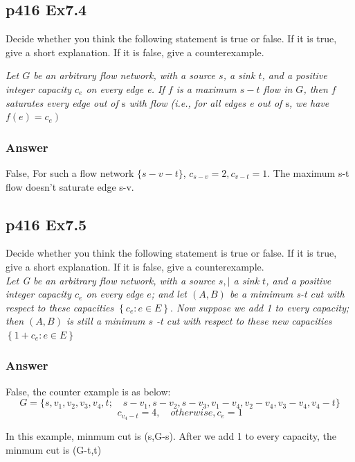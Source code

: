 \documentclass[a4paper]{article}
\begin{document}
\subsection*{p416 Ex7.4}
\begin{adjustwidth}{1cm}{1cm}
	Decide whether you think the following statement is true or false. If it is true, give a short explanation. If it is false, give a counterexample.

	\emph{
	Let $G$ be an arbitrary flow network, with a source $s$, a sink $t$, and a positive integer capacity $c_{e}$ on every edge e. If $f$ is a maximum $s-t$ flow in $G$, then $f$ saturates every edge out of $\mathrm{s}$ with flow (i.e., for all edges e out of $\mathrm{s}$, we have
	$\left.f(e)=c_{e}\right)$}
\end{adjustwidth}

\subsubsection*{Answer}
False, For such a flow network $\{s-v-t\}$, $c_{s-v} = 2, c_{v-t} = 1$. The maximum s-t flow doesn’t saturate edge s-v.
\vspace{2cm}

\subsection*{p416 Ex7.5}

\begin{adjustwidth}{1cm}{1cm}
	Decide whether you think the following statement is true or false. If it is true, give a short explanation. If it is false, give a counterexample.\\
	\emph{
	Let G be an arbitrary flow network, with a source $s, \mid$ a sink $t$, and a positive integer capacity $c_{e}$ on every edge $e$; and let $(A, B)$ be a mimimum s-t cut with respect to these capacities $\left\{c_{e}: e \in E\right\} .$ Now suppose we add 1 to every capacity; then $(A, B)$ is still a minimum $s$ -t cut with respect to these new capacities $\left\{1+c_{e}: e \in E\right\}$}
\end{adjustwidth}
\subsubsection*{Answer}
False, the counter example is as below:
$$G = \{s,v_1,v_2,v_3,v_4,t; \quad s-v_1,s-v_2,s-v_3,v_1-v_4,v_2-v_4,v_3-v_4,v_4-t\}$$
$$
	c_{v_4-t}=4, \quad otherwise, c_e = 1
$$

In this example, minmum cut is (s,G-s). After we add 1 to every capacity, the minmum cut is (G-t,t)
\end{document}
